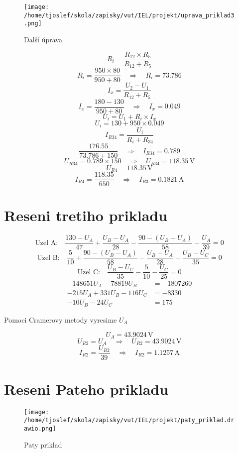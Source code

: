 \documentclass{article}
\begin{document}
\begin{figure}[!ht]
  \centering
  \texttt{[image: /home/tjoslef/skola/zapisky/vut/IEL/projekt/uprava\_priklad3.png]}
  \caption{Další úprava}
  \label{fig:upravapriklad2}
\end{figure}

\[
    R_i = \frac{R_{12} \times R_5}{R_{12} + R_5}
\]
\[
    R_i = \frac{950 \times 80}{950 + 80} \quad \Rightarrow \quad R_i = 73.786
\]
\[
    I_x = \frac{U_2 - U_1}{R_{12} + R_5}
\]
\[
    I_x = \frac{180 - 130}{950 + 80} \quad \Rightarrow \quad I_x = 0.049
\]
\[
    U_i = U_1 + R_i \times I_x
\]
\[
    U_i = 130 + 950 \times 0.049
\]
\[
    I_{R34} = \frac{U_i}{R_i + R_{34}}
\]
\[
    \frac{176.55}{73.786 + 150} \quad \Rightarrow \quad I_{R34} = 0.789
\]
\[
    U_{R34} = 0.789 \times 150 \quad \Rightarrow \quad U_{R34} = 118.35 \, \text{V}
\]
\[
    U_{R4} = 118.35 \, \text{V}
\]
\[
    I_{R4} = \frac{118.35}{650} \quad \Rightarrow \quad I_{R3} = 0.1821 \, \text{A}
\]

\section{Reseni tretiho prikladu}
\[
    \text{Uzel A:} \quad \frac{130 - U_A}{47} + \frac{U_B -U_A}{28} - \frac{90 - (U_B - U_A)}{58} - \frac{U_A}{39} = 0
\]
\[
    \text{Uzel B:} \quad \frac{5}{10} + \frac{90 - (U_B - U_A)}{58} - \frac{U_B - U_A}{28} - \frac{U_B -U_C}{35} = 0
\]
\[
    \text{Uzel C:} \quad \frac{U_B - U_C}{35} - \frac{5}{10} - \frac{U_C}{25} = 0
\]
\begin{align*}
    -148651U_A - 78819U_B &= -1807260 \\
    -215U_A + 331U_B - 116U_C &= -8330 \\
    -10U_B - 24U_C &= 175
\end{align*}

Pomoci Cramerovy metody vyresime \( U_A \)

\[
    U_A = 43.9024 \, \text{V}
\]
\[
    U_{R2} = U_A  \quad \Rightarrow \quad U_{R2} = 43.9024 \, \text{V}
\]
\[
    I_{R2} = \frac{U_{R2}}{39} \quad \Rightarrow \quad I_{R2} = 1.1257 \, \text{A}
\]
\section{Reseni Pateho prikladu}
\begin{figure}[!ht]
  \centering
  \texttt{[image: /home/tjoslef/skola/zapisky/vut/IEL/projekt/paty\_priklad.drawio.png]}
  \caption{Paty priklad}
  \label{fig:priklad5}
\end{figure}
\end{document}
